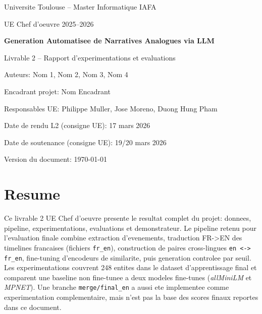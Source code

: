 ﻿\begin{titlepage}
  \centering
  {\Large Universite Toulouse -- Master Informatique IAFA\par}
  \vspace{0.6cm}
  {\large UE Chef d'oeuvre 2025--2026\par}
  \vspace{2cm}
  {\huge \textbf{Generation Automatisee de Narratives Analogues via LLM}\par}
  \vspace{0.8cm}
  {\Large Livrable 2 -- Rapport d'experimentations et evaluations\par}
  \vspace{1.2cm}
  {\large Auteurs: Nom 1, Nom 2, Nom 3, Nom 4\par}
  \vspace{0.3cm}
  {\large Encadrant projet: Nom Encadrant\par}
  \vspace{0.3cm}
  {\large Responsables UE: Philippe Muller, Jose Moreno, Duong Hung Pham\par}
  \vfill
  {\large Date de rendu L2 (consigne UE): 17 mars 2026\par}
  {\large Date de soutenance (consigne UE): 19/20 mars 2026\par}
  \vspace{0.8cm}
  {\large Version du document: \today\par}
\end{titlepage}

\chapter*{Resume}
Ce livrable 2 UE Chef d'oeuvre presente le resultat complet du projet:
donnees, pipeline, experimentations, evaluations et demonstrateur.
Le pipeline retenu pour l'evaluation finale combine extraction d'evenements,
traduction FR->EN des timelines francaises (fichiers \texttt{fr\_en}),
construction de paires cross-lingues \texttt{en <-> fr\_en},
fine-tuning d'encodeurs de similarite, puis generation controlee par seuil.
Les experimentations couvrent 248 entites dans le dataset d'apprentissage
final et comparent une baseline non fine-tunee a deux modeles fine-tunes
(\textit{allMiniLM} et \textit{MPNET}).
Une branche \texttt{merge/final\_en} a aussi ete implementee comme
experimentation complementaire, mais n'est pas la base des scores finaux
reportes dans ce document.

